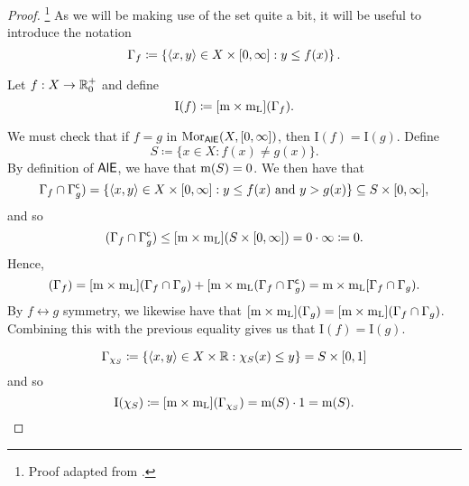\begin{thm}[Integral]
\begin{savenotes}
\begin{rmk}
\end{rmk}
\begin{proof}\footnote{Proof adapted from \cite[pg.~377]{Pugh}.}
As we will be making use of the set quite a bit, it will be useful to introduce the notation
\begin{equation}
\Gamma _f\coloneqq \left\{ \langle x,y\rangle\in X\times [0,\infty ]:y\leq f(x)\right\} .
\end{equation}

Let $f:X\rightarrow \mathbb{R} _0^+$ and define
\begin{equation}
\mathrm{I}(f)\coloneqq [\mathrm{m} \times \mathrm{m} _{\mathrm{L}}](\Gamma _f) .
\end{equation}

We must check that if $f=g$ in $\operatorname{Mor} _{\mathsf{AlE}}(X,[0,\infty ])$, then $\mathrm{I}(f)=\mathrm{I}(g)$.  Define
\begin{equation}
S\coloneqq \{ x\in X:f(x)\neq g(x)\} .
\end{equation}
By definition of $\mathsf{AlE}$, we have that $\mathrm{m} (S)=0$.  We then have that
\begin{equation}
\Gamma _f\cap \Gamma _g^{\mathsf{c}})=\{ \langle x,y\rangle\in X\times [0,\infty ]:y\leq f(x)\text{ and }y>g(x)\} \subseteq S\times [0,\infty ],
\end{equation}
and so
\begin{equation}
[\meas \times \meas _{\mathrm{L}}](\Gamma _f\cap \Gamma _g^{\comp})\leq [\meas \times \meas _{\mathrm{L}}](S\times [0,\infty ])=0\cdot \infty \coloneqq 0.
\end{equation}
Hence,
\begin{equation}
[\meas \times \meas _{\mathrm{L}}](\Gamma _f)=[\meas \times \meas _{\mathrm{L}}](\Gamma _f\cap \Gamma _g)+[\meas \times \meas _{\mathrm{L}}(\Gamma _f\cap \Gamma _g^{\comp})=\meas \times \meas _{\mathrm{L}}[\Gamma _f\cap \Gamma _g).
\end{equation}
By $f\leftrightarrow g$ symmetry, we likewise have that $[\mathrm{m} \times \mathrm{m} _{\mathrm{L}}](\Gamma _g)=[\mathrm{m} \times \mathrm{m} _{\mathrm{L}}](\Gamma _f\cap \Gamma _g)$.  Combining this with the previous equality gives us that $\mathrm{I}(f)=\mathrm{I}(g)$.

\begin{equation}
\Gamma _{\chi _S}\coloneqq \left\{ \langle x,y\rangle\in X\times \mathbb{R} :\chi _S(x)\leq y\right\} =S\times [0,1]
\end{equation}
and so
\begin{equation}
\mathrm{I}(\chi _S)\coloneqq [\mathrm{m} \times \mathrm{m} _{\mathrm{L}}](\Gamma _{\chi _S})=\mathrm{m} (S)\cdot 1=\mathrm{m} (S).
\end{equation}


\end{proof}
\end{savenotes}
\end{thm}
